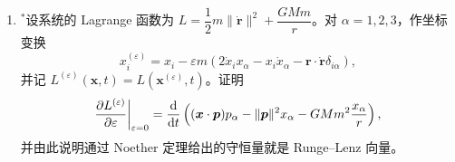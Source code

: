 \begin{enumerate}
    解：(1)由于$\J$是守恒量，由Newton运动方程$\dot{\p}=-U'(r)\dfrac{\r}{r}$得到
    \begin{align*}
        \dot{\boldsymbol{A}}=&\dot{\p}\times \boldsymbol{A}+mU'(r)\frac{\r \cdot \dot{\r}}{r}\cdot \r+mU'(r)\dot{\r}\\
        =&-U'(r)\frac{\r}{r}\times(\r \times \p)+\frac{U'(r)}{r}(\r \cdot \p)\r+U(r)\p\\
        =&U'(r)r\p+U(r)\p=(rU'(r)+U(r))\p.
    \end{align*}
    所以$\boldsymbol{A}$是守恒量当且仅当$rU'(r)+U(r)=0$，即$U(r)=-\dfrac{k}{r}$.\\
    (2)势能为$U(r)=-\dfrac{GMm}{r}$.
    \begin{align*}
        \r \cdot =&\r \cdot(\p \times \J)+mr^2U(r)\\
        =&(\r \times \p)\cdot \J +mr^2U(r)=\|\J\|^2-GMm^2r.
    \end{align*}
    记$\boldsymbol{A}$与$\r$的夹角为$\theta$，则$r(\|\boldsymbol{A}\|\cos\theta+GMm^2)=\|\J\|^2$，即
    \begin{align*}
        r=\frac{(GMm^2)^{-2}\|\J\|^2}{1+(GMm^2)^{-2}\|\boldsymbol{A}\|\cos\theta}.
    \end{align*}
    这就是行星轨道的方程，其中$\|\J\|$和$\|\boldsymbol{A}\|$都是常数，且$\|\boldsymbol{A}\|$正比于轨道的离心率。
    当$\theta=0$时，$r$最小，于是$\boldsymbol{A}$的方向为近日点方向。

    \item ${ }^*$设系统的 Lagrange 函数为 $L=\dfrac{1}{2}m\|\dot{\boldsymbol{r}}\|^2+\dfrac{GMm}{r}$。对 $\alpha=1,2,3$，作坐标变换
    $$x_i^{(\varepsilon)}=x_i-\varepsilon m(2\dot{x}_i x_\alpha-x_i \dot{x}_\alpha-\boldsymbol{r} \cdot \dot{\boldsymbol{r}} \delta_{i \alpha}),$$
    并记 $L^{(\varepsilon)}(\boldsymbol{x}, t)=L(\boldsymbol{x}^{(\varepsilon)}, t)$。证明
    $$\frac{\partial L^{(\varepsilon)}}{\partial \varepsilon}\bigg|_{\varepsilon=0}
    =\frac{{\rm d}}{{\rm d}t}\left((\boldsymbol{x} \cdot \boldsymbol{p}) p_\alpha-\|\boldsymbol{p}\|^2 x_\alpha-GMm^2 \frac{x_\alpha}{r}\right),$$
    并由此说明通过 Noether 定理给出的守恒量就是 Runge--Lenz 向量。


\end{enumerate}

